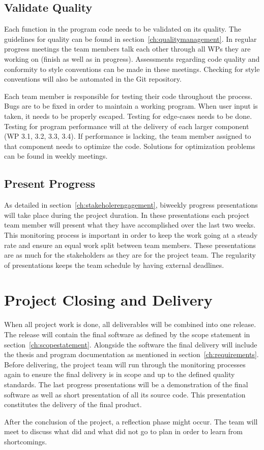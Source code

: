 \subsection{Validate Quality}
\label{ch:validatequality}
Each function in the program code needs to be validated on its quality. The guidelines for quality can be found in section~\ref{ch:qualitymanagement}. In regular progress meetings the team members talk each other through all \ac{WP}s they are working on (finish as well as in progress). Assessments regarding code quality and conformity to style conventions can be made in these meetings. Checking for style conventions will also be automated in the Git repository.

Each team member is responsible for testing their code throughout the process. Bugs are to be fixed in order to maintain a working program. When user input is taken, it needs to be properly escaped. Testing for edge-cases needs to be done. Testing for program performance will at the delivery of each larger component (\ac{WP} 3.1, 3.2, 3.3, 3.4). If performance is lacking, the team member assigned to that component needs to optimize the code. Solutions for optimization problems can be found in weekly meetings.

\subsection{Present Progress}
\label{ch:presentprogress}
As detailed in section~\ref{ch:stakeholerengagement}, biweekly progress presentations will take place during the project duration. In these presentations each project team member will present what they have accomplished over the last two weeks. This monitoring process is important in order to keep the work going at a steady rate and ensure an equal work split between team members. These presentations are as much for the stakeholders as they are for the project team. The regularity of presentations keeps the team schedule by having external deadlines.


\section{Project Closing and Delivery}
\label{ch:projectclosing}
When all project work is done, all deliverables will be combined into one release. The release will contain the final software as defined by the scope statement in section~\ref{ch:scopestatement}. Alongside the software the final delivery will include the thesis and program documentation as mentioned in section~\ref{ch:requirements}. Before delivering, the project team will run through the monitoring processes again to ensure the final delivery is in scope and up to the defined quality standards. The last progress presentations will be a demonstration of the final software as well as short presentation of all its source code. This presentation constitutes the delivery of the final product.

After the conclusion of the project, a reflection phase might occur. The team will meet to discuss what did and what did not go to plan in order to learn from shortcomings.




